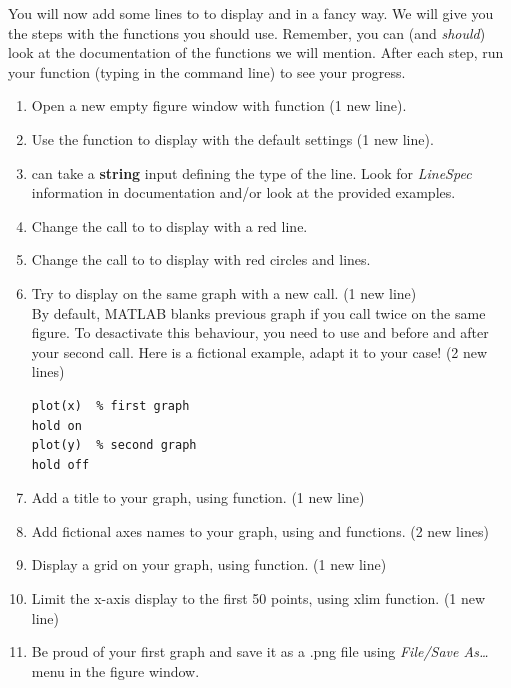 \documentclass{article}
\begin{document}
You will now add some lines to  to display  and  in a fancy way.
We will give you the steps with the functions you should use.
Remember, you can (and \emph{should}) look at the documentation of the functions we will mention.
After each step, run your function (typing  in the command line) to see your progress.
\begin{enumerate}
  \item Open a new empty figure window with  function (1 new line).
  \item Use the  function to display  with the default settings (1 new line).
  \item {} can take a \textbf{string} input defining the type of the line.
    Look for \emph{LineSpec} information in  documentation and/or look at the provided examples.
  \item Change the call to  to display  with a red line.
  \item Change the call to  to display  with red circles and lines.
  \item Try to display  on the same graph with a new  call. (1 new line)\\
    By default, MATLAB blanks previous graph if you call  twice on the same figure.
    To desactivate this behaviour, you need to use  and  before and after
    your second  call.
    Here is a fictional example, adapt it to your case! (2 new lines)
\begin{lstlisting}
plot(x)  % first graph
hold on
plot(y)  % second graph
hold off
\end{lstlisting}
  \item Add a title to your graph, using  function. (1 new line)
  \item Add fictional axes names to your graph, using  and  functions. (2 new lines)
  \item Display a grid on your graph, using  function. (1 new line)
  \item Limit the x-axis display to the first 50 points, using \mcode xlim function. (1 new line)
  \item Be proud of your first graph and save it as a .png file using \emph{File/Save As\dots} menu in the figure window.
\end{enumerate}
\end{document}
